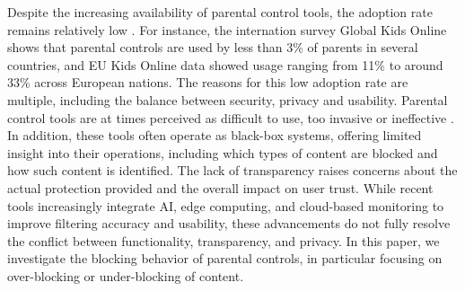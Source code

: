 Despite the increasing availability of parental control tools, the adoption rate remains relatively low \cite{ardito_designing_2021}.
For instance, the internation survey Global Kids Online shows that parental controls are used by less than 3\% of parents in several countries, and EU Kids Online data showed usage ranging from 11\% to around 33\% across European nations\cite{stoilova_parental_2024}.
The reasons for this low adoption rate are multiple, including the balance between security, privacy and usability.
Parental control tools are at times perceived as difficult to use, too invasive or ineffective \cite{ardito_designing_2021}.
In addition, these tools often operate as black-box systems, offering limited insight into their operations, including which types of content are blocked and how such content is identified\cite{ali_betrayed_2020}.
The lack of transparency raises concerns about the actual protection provided and the overall impact on user trust. While recent tools increasingly integrate AI, edge computing, and cloud-based monitoring to improve filtering accuracy and usability\cite{razak_piwall_2024, ramezanian_parental_2021}, these advancements do not fully resolve the conflict between functionality, transparency, and privacy.
In this paper, we investigate the blocking behavior of parental controls, in particular focusing on over-blocking or under-blocking of content.


